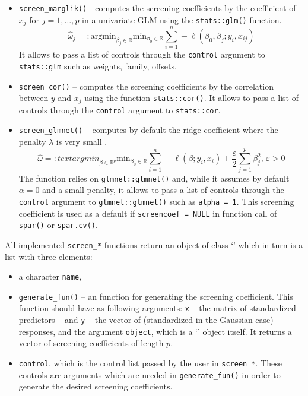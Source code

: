 \documentclass[
  article]{jss}
\newcommand{\class}[1]{`\code{#1}'}
\begin{document}
\begin{itemize}
\item
  \texttt{screen\_marglik()} - computes the screening coefficients by
  the coefficient of \(x_j\) for \(j =1,\dots,p\) in a univariate GLM
  using the \texttt{stats::glm()} function. \[
   \hat\omega_j=:\text{argmin}_{\beta_j\in \mathbb{R}}\text{min}_{{\beta_0}\in\mathbb{R}}\sum_{i=1}^n -\ell(\beta_0,\beta_j;y_i,x_{ij})
   \] It allows to pass a list of controls through the \texttt{control}
  argument to \texttt{stats::glm} such as weights, family, offsets.
\item
  \texttt{screen\_cor()} -- computes the screening coefficients by the
  correlation between \(y\) and \(x_j\) using the function
  \texttt{stats::cor()}. It allows to pass a list of controls through
  the \texttt{control} argument to \texttt{stats::cor}.
\item
  \texttt{screen\_glmnet()} -- computes by default the ridge coefficient
  where the penalty \(\lambda\) is very small \citep[see][ for
  clarification]{parzer2024glms}. \[
  \hat\omega=: text{argmin}_{\beta\in \mathbb{R}^p}\text{min}_{{\beta_0}\in\mathbb{R}}\sum_{i=1}^n -\ell(\beta;y_i,x_i) + \frac{\varepsilon}{2}\sum_{j=1}^p{\beta}_j^2, \, \varepsilon > 0
  \] The function relies on \texttt{glmnet::glmnet()} and, while it
  assumes by default \(\alpha = 0\) and a small penalty, it allows to
  pass a list of controls through the \texttt{control} argument to
  \texttt{glmnet::glmnet()} such as \texttt{alpha\ =\ 1}. This screening
  coefficient is used as a default if \texttt{screencoef\ =\ NULL} in
  function call of \texttt{spar()} or \texttt{spar.cv()}.
\end{itemize}

All implemented \texttt{screen\_*} functions return an object of class
\class{screencoef} which in turn is a list with three elements:

\begin{itemize}
\item
  a character \texttt{name},
\item
  \texttt{generate\_fun()} -- an  function for generating
  the screening coefficient. This function should have as following
  arguments: \texttt{x} -- the matrix of standardized predictors -- and
  \texttt{y} -- the vector of (standardized in the Gaussian case)
  responses, and the argument \texttt{object}, which is a
  \class{screencoef} object itself. It returns a vector of screening
  coefficients of length \(p\).
\item
  \texttt{control}, which is the control list passed by the user in
  \texttt{screen\_*}. These controls are arguments which are needed in
  \texttt{generate\_fun()} in order to generate the desired screening
  coefficients.
\end{itemize}
\end{document}
